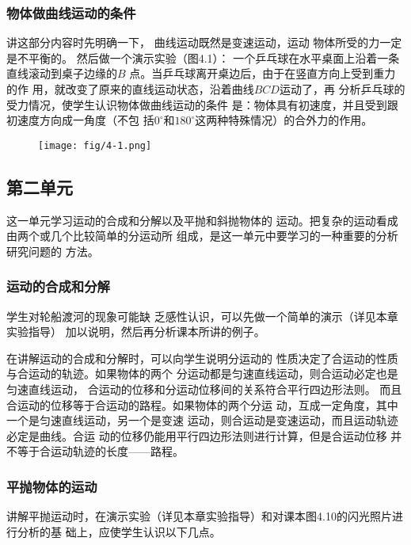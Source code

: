 \subsubsection{物体做曲线运动的条件}

讲这部分内容时先明确一下，
曲线运动既然是变速运动，运动
物体所受的力一定是不平衡的。
然后做一个演示实验（图4.1）：
一个乒乓球在水平桌面上沿着一条直线滚动到桌子边缘的$B$
点。当乒乓球离开桌边后，由于在竖直方向上受到重力的作
用，就改变了原来的直线运动状态，沿着曲线$BCD$运动了，再
分析乒乓球的受力情况，使学生认识物体做曲线运动的条件
是：物体具有初速度，并且受到跟初速度方向成一角度（不包
括$0^{\circ}$和$180^{\circ}$这两种特殊情况）的合外力的作用。

\begin{figure}[htp]
    \centering
\texttt{[image: fig/4-1.png]}
    \caption{}
\end{figure}

\subsection{第二单元}
这一单元学习运动的合成和分解以及平抛和斜抛物体的
运动。把复杂的运动看成由两个或几个比较简单的分运动所
组成，是这一单元中要学习的一种重要的分析研究问题的
方法。

\subsubsection{运动的合成和分解}

学生对轮船渡河的现象可能缺
乏感性认识，可以先做一个简单的演示（详见本章实验指导）
加以说明，然后再分析课本所讲的例子。

在讲解运动的合成和分解时，可以向学生说明分运动的
性质决定了合运动的性质与合运动的轨迹。如果物体的两个
分运动都是匀速直线运动，则合运动必定也是匀速直线运动，
合运动的位移和分运动位移间的关系符合平行四边形法则。
而且合运动的位移等于合运动的路程。如果物体的两个分运
动，互成一定角度，其中一个是匀速直线运动，另一个是变速
运动，则合运动是变速运动，而且运动轨迹必定是曲线。合运
动的位移仍能用平行四边形法则进行计算，但是合运动位移
并不等于合运动轨迹的长度——路程。

\subsubsection{平抛物体的运动}

讲解平抛运动时，在演示实验（详见本章实验指导）和对课本图4.10的闪光照片进行分析的基
础上，应使学生认识以下几点。

